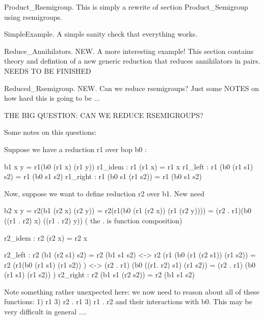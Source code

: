   Product_Rsemigroup.  This is simply a rewrite 
     of section Product_Semigroup using rsemigroups. 

   SimpleExample. A simple sanity check that everything works.  

   Reduce_Annihilators. NEW. A more interesting example! 
      This section contains theory and defintion of a new 
      generic reduction that reduces annihilators in pairs. 
      NEEDS TO BE FINISHED 

   Reduced_Rsemigroup. NEW. Can we reduce rsemigroups?    
      Just some NOTES on how hard this is going to be ... 




THE BIG QUESTION: CAN WE REDUCE RSEMIGROUPS? 

 Some notes on this questions: 

Suppose we have a reduction r1 over bop b0 : 

   b1 x y = r1(b0 (r1 x) (r1 y)) 
   r1_idem  : r1 (r1 x) = r1 x 
   r1_left  : r1 (b0 (r1 s1) s2) = r1 (b0 s1 s2)
   r1_right : r1 (b0 s1 (r1 s2)) = r1 (b0 s1 s2)

Now, suppose we want to define reduction r2 over b1.  New need

    b2 x y = r2(b1 (r2 x) (r2 y)) 
           = r2(r1(b0 (r1 (r2 x)) (r1 (r2 y))))
           = (r2 . r1)(b0 ((r1 . r2) x) ((r1 . r2) y))   ( the . is function composition) 

    r2_idem : r2 (r2 x) = r2 x 

    r2_left  : r2 (b1 (r2 s1) s2) = r2 (b1 s1 s2)
           <-> r2 (r1 (b0 (r1 (r2 s1)) (r1 s2)) = r2 (r1(b0 (r1 s1) (r1 s2)) )
           <-> (r2 . r1) (b0 ((r1. r2) s1) (r1 s2)) = (r2 . r1) (b0 (r1 s1) (r1 s2)) )
    r2_right : r2 (b1 s1 (r2 s2)) = r2 (b1 s1 s2)

Note something rather unexpected here:  we now need to reason about all of these
functions: 
   1) r1 
   3) r2 . r1  
   3) r1 . r2
and their interactions with b0.  This may be very difficult in general .... 

